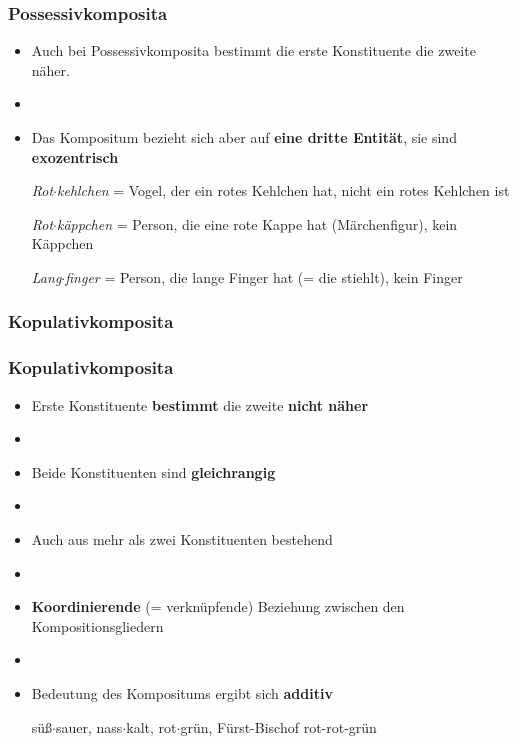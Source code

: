 \begin{frame}
\frametitle{Possessivkomposita}

\begin{itemize}
	\item Auch bei Possessivkomposita bestimmt die erste Konstituente die zweite näher.
	\item[]
	\item Das Kompositum bezieht sich aber auf \textbf{eine dritte Entität}, sie sind \textbf{exozentrisch}
	
	\ea \emph{Rot$\cdot$kehlchen} = Vogel, der ein rotes Kehlchen hat, nicht ein rotes Kehlchen ist
	\z
	
	\ea \emph{Rot$\cdot$käppchen} = Person, die eine rote Kappe hat (Märchenfigur), kein Käppchen
	\z
	
	\ea \emph{Lang$\cdot$finger} = Person, die lange Finger hat (= die stiehlt), kein Finger
	\z
	
\end{itemize}


\end{frame}


\subsubsection{Kopulativkomposita}


\begin{frame}
\frametitle{Kopulativkomposita}

\begin{itemize}
	\item Erste Konstituente \textbf{bestimmt} die zweite \textbf{nicht näher}
	\item[]
	\item Beide Konstituenten sind \textbf{gleichrangig}
	\item[]
	\item Auch aus mehr als zwei Konstituenten bestehend
	\item[]
	\item \textbf{Koordinierende} (= verknüpfende) Beziehung zwischen den Kompositionsgliedern
	\item[]
	\item Bedeutung des Kompositums ergibt sich \textbf{additiv}
	
	\eal 
	\ex süß$\cdot$sauer, nass$\cdot$kalt, rot$\cdot$grün, Fürst-Bischof
	\ex rot-rot-grün
	\zl
	
\end{itemize}


\end{frame}


